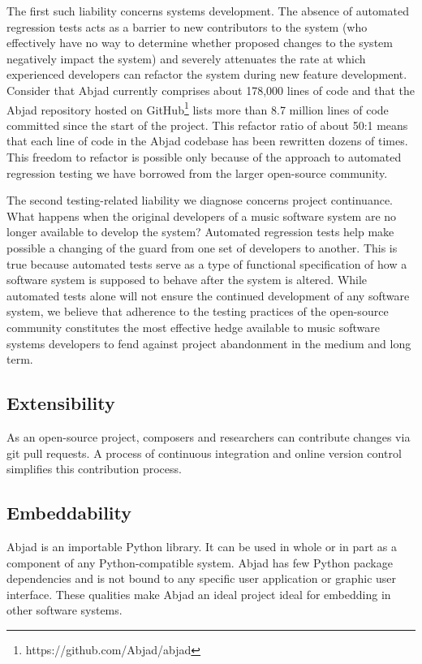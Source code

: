 \documentclass{article}
\begin{document}
The first such liability concerns systems development. The absence of automated
regression tests acts as a barrier to new contributors to the system (who
effectively have no way to determine whether proposed changes to the system
negatively impact the system) and severely attenuates the rate at which
experienced developers can refactor the system during new feature development.
Consider that Abjad currently comprises about 178,000 lines of code and that
the Abjad repository hosted on GitHub\footnote{https://github.com/Abjad/abjad}
lists more than 8.7 million lines of code committed since the start of the
project. This refactor ratio of about 50:1 means that each line of code in the
Abjad codebase has been rewritten dozens of times. This freedom to refactor is
possible only because of the approach to automated regression testing we have
borrowed from the larger open-source community.

The second testing-related liability we diagnose concerns project continuance.
What happens when the original developers of a music software system are no
longer available to develop the system? Automated regression tests help make
possible a changing of the guard from one set of developers to another. This is
true because automated tests serve as a type of functional specification of how
a software system is supposed to behave after the system is altered. While
automated tests alone will not ensure the continued development of any software
system, we believe that adherence to the testing practices of the open-source
community constitutes the most effective hedge available to music software
systems developers to fend against project abandonment in the medium and long
term.

\subsection{Extensibility}

As an open-source project, composers and researchers can contribute changes via
git pull requests. A process of continuous integration and online version
control simplifies this contribution process.

\subsection{Embeddability}

Abjad is an importable Python library. It can be used in whole or in part as a
component of any Python-compatible system. Abjad has few Python package
dependencies and is not bound to any specific user application or graphic user
interface. These qualities make Abjad an ideal project ideal for embedding in
other software systems.
\end{document}
